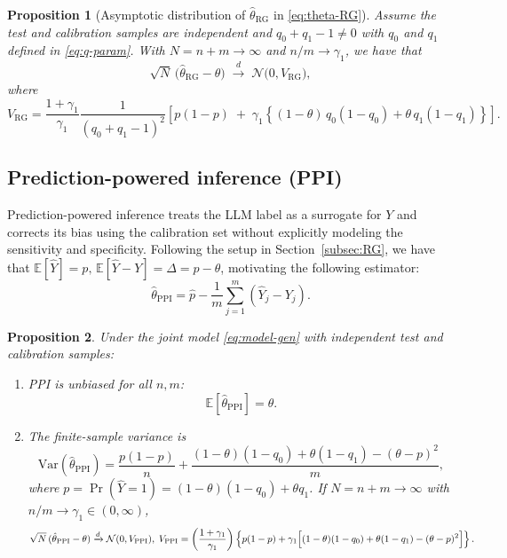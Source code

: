 \documentclass[11pt]{article}
\newcommand{\E}{\mathbb{E}}
\newcommand{\Var}{\mathrm{Var}}
\newcommand{\1}{\mathbf{1}}
\newtheorem{proposition}{Proposition}
\theoremstyle{remark}
\begin{document}
\begin{proposition}[Asymptotic distribution of $\hat\theta_{\mathrm{RG}}$ in \eqref{eq:theta-RG}]
\label{prop:var-RG}
Assume the test and calibration samples are independent and  $q_0+q_1-1 \neq 0$ with $q_0$ and $q_1$ defined in \eqref{eq:q-param}. With $N=n+m \to \infty$ and $n/m\to \gamma_1$, we have that
\[
\sqrt{N}\,\bigl(\hat\theta_{\mathrm{RG}} - \theta\bigr)
\;\xrightarrow{d}\;
\mathcal{N}\bigl(0, V_{\mathrm{RG}}\bigr),
\]
where
\begin{equation}
V_{\mathrm{RG}}
=
\frac{1+\gamma_1}{\gamma_1}\frac{1}{(q_0+q_1-1)^2}
\left[
p(1-p)
\;+\;
\gamma_1\left\{
(1-\theta)\,q_0(1-q_0)
+
\theta\,q_1(1-q_1)
\right\}
\right].
\label{eq:RG-var}
\end{equation}
\end{proposition}



\subsection{Prediction-powered inference (PPI)}
\label{subsec:PPI}

Prediction-powered inference treats the LLM label as a surrogate for $Y$ and corrects its bias using the calibration set without explicitly modeling the sensitivity and specificity. Following the setup in Section~\ref{subsec:RG}, we have that $\E[\hat Y] = p,\,
\E[\hat Y - Y] = \Delta = p-\theta$, motivating the following estimator:
\begin{equation}
\hat\theta_{\mathrm{PPI}} = \hat p - \frac{1}{m}\sum_{j=1}^m (\hat Y_j - Y_j).
\label{eq:theta-PPI}
\end{equation}

\begin{proposition}
\label{prop:PPI-bias-var}
Under the joint model \eqref{eq:model-gen} with independent test and calibration samples:
\begin{enumerate}[label=(\roman*),leftmargin=1.5em]
\item PPI is unbiased for all $n,m$:
\[
\E[\hat\theta_{\mathrm{PPI}}] = \theta.
\]

\item The finite-sample variance is
\begin{equation}
\Var(\hat\theta_{\mathrm{PPI}})
=
\frac{p(1-p)}{n}
+
\frac{(1-\theta)(1-q_0)+\theta(1-q_1)-(\theta-p)^2}{m},
\label{eq:ppi-var}
\end{equation}
where $p=\Pr(\hat Y=1)=(1-\theta)(1-q_0)+\theta q_1$.
If $N=n+m\to\infty$ with $n/m\to\gamma_1\in(0,\infty)$,
\[
\sqrt{N}\,(\hat\theta_{\mathrm{PPI}}-\theta)
\xrightarrow{d}
\mathcal{N}(0,V_{\mathrm{PPI}}),\;V_{\mathrm{PPI}}
=
\left(\frac{1+\gamma_1}{\gamma_1}\right)\left\{p(1-p)
+
\gamma_1\Bigl[(1-\theta)(1-q_0)+\theta(1-q_1)-(\theta-p)^2\Bigr]\right\}.
\]
\end{enumerate}
\end{proposition}
\end{document}
